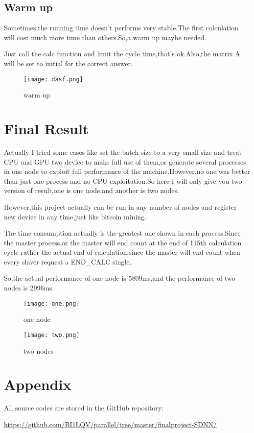 \documentclass[12pt]{scrartcl} %
\begin{document}
\subsection{Warm up}
Sometimes,the running time doesn't performs very stable.The first calculation will cost much more time than others.So,a warm up maybe needed.

Just call the calc function and limit the cycle time,that's ok.Also,the matrix A will be set to initial for the correct answer.
\begin{figure}[H]
    \centering
    \texttt{[image: dasf.png]}
    \caption{warm up}
\end{figure}
\section{Final Result}
Actually I tried some cases like set the batch size to a very small size and treat CPU and GPU two device to make full use of them,or generate several processes in one node to exploit full performance of the machine.However,no one was better than just one process and no CPU exploitation.So here I will only give you two version of result,one is one node,and another is two nodes.

However,this project actually can be run in any number of nodes and register new device in any time,just like bitcoin mining.

The time consumption actually is the greatest one shown in each process.Since the master process,or the master will end count at the end of 115th calculation cycle rather the actual end of calculation,since the master will end count when every slaver request a END\_CALC single.

So,the actual performance of one node is 5809ms,and the performance of two nodes is 2996ms.
\begin{figure}[H]
    \centering
    \texttt{[image: one.png]}
    \caption{one node}
    \label{}
\end{figure}
\begin{figure}[H]
    \centering
    \texttt{[image: two.png]}
    \caption{two nodes}
    \label{}
\end{figure}
\section{Appendix}
All source codes are stored in the GitHub repository:


\url{https://github.com/BI1LQV/parallel/tree/master/finalproject-SDNN/}
\end{document}
